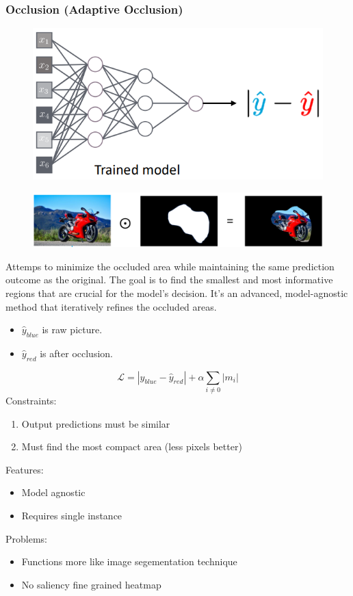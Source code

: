 \subsubsection{Occlusion (Adaptive Occlusion)}
\begin{figure}[!h]
    \includegraphics[width = 0.7 \columnwidth]{figures/XAI2/AdaptiveOcclusionNetwork.png}
\end{figure}
\begin{figure}[!h]
    \includegraphics[width =  \columnwidth]{figures/XAI2/AdaptiveOcclusionPictures.png}
\end{figure}

Attemps to minimize the occluded area while maintaining the same prediction outcome as the original.
The goal is to find the smallest and most informative regions that are crucial for the model's decision.
It's an advanced, model-agnostic method that iteratively refines the occluded areas.
\begin{itemize}
    \item \(\hat{y}_{blue}\) is raw picture.
    \item \(\hat{y}_{red}\) is after occlusion.
\end{itemize}
\[
\mathcal{L} = |\hat{y}_{blue}-\hat{y}_{red}| + \alpha \sum_{i \neq 0}|m_i|
\]
Constraints:
\begin{enumerate}
    \item Output predictions must be similar
    \item Must find the most compact area (less pixels better)
\end{enumerate}
Features:
\begin{itemize}
    \item Model agnostic
    \item Requires single instance
\end{itemize}
Problems:
\begin{itemize}
    \item Functions more like image segementation technique
    \item No saliency fine grained heatmap
\end{itemize}


